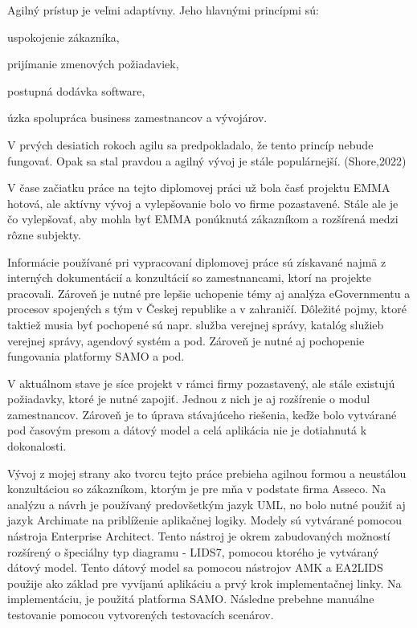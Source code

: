Agilný prístup je veľmi adaptívny. Jeho hlavnými princípmi sú:

\startitemize
\item uspokojenie zákazníka, 
\item prijímanie zmenových požiadaviek,
\item postupná dodávka software,
\item úzka spolupráca business zamestnancov a vývojárov.
\stopitemize

V prvých desiatich rokoch agilu sa predpokladalo, že tento princíp nebude fungovať. Opak sa stal pravdou a agilný vývoj je stále populárnejší.
\scr(Shore,2022)


V čase začiatku práce na tejto diplomovej práci už bola časť projektu EMMA hotová, ale aktívny vývoj a vylepšovanie bolo vo firme pozastavené. Stále ale je čo vylepšovať, aby mohla byť EMMA ponúknutá zákazníkom a rozšírená medzi rôzne subjekty.

Informácie používané pri vypracovaní diplomovej práce sú získavané najmä z interných dokumentácií a konzultácií so zamestnancami, ktorí na projekte pracovali. Zároveň je nutné pre lepšie uchopenie témy aj analýza eGovernmentu a procesov spojených s tým v Českej republike a v zahraničí. Dôležité pojmy, ktoré taktiež musia byť pochopené sú napr. služba verejnej správy, katalóg služieb verejnej správy, agendový systém a pod. Zároveň je nutné aj pochopenie fungovania platformy SAMO a pod.

V aktuálnom stave je síce projekt v rámci firmy pozastavený, ale stále existujú požiadavky, ktoré je nutné zapojiť. Jednou z nich je aj rozšírenie o modul zamestnancov. Zároveň je to úprava stávajúceho riešenia, keďže bolo vytvárané pod časovým presom a dátový model a celá aplikácia nie je dotiahnutá k dokonalosti. 

Vývoj z mojej strany ako tvorcu tejto práce prebieha agilnou formou a neustálou konzultáciou so zákazníkom, ktorým je pre mňa v podstate firma Asseco. Na analýzu a návrh je používaný predovšetkým jazyk UML, no bolo nutné použiť aj jazyk Archimate na priblíženie aplikačnej logiky. Modely sú vytvárané pomocou nástroja Enterprise Architect. Tento nástroj je okrem zabudovaných možností rozšírený o špeciálny typ diagramu - LIDS7, pomocou ktorého je vytváraný dátový model. Tento dátový model sa pomocou nástrojov AMK a EA2LIDS použije ako základ pre vyvíjanú aplikáciu a prvý krok implementačnej linky. Na implementáciu, je použitá platforma SAMO. Následne prebehne manuálne testovanie pomocou vytvorených testovacích scenárov.

